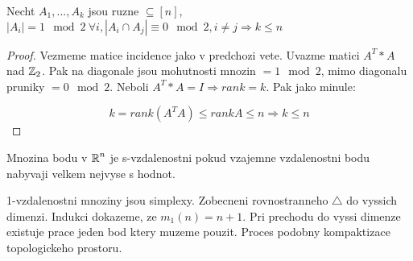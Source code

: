 \begin{theorem}
	Necht $A_1, ... , A_k$ jsou ruzne $ \subseteq [n]$, $ |A_i| = 1 \mod2 \ \forall i, |A_i \cap A_j| \equiv 0 \mod2, i \ne j \Rightarrow k \leq n$
\end{theorem}
\begin{proof}
	Vezmeme matice incidence jako v predchozi vete. Uvazme matici $A^T * A$ nad $\operatorname{\mathbb{Z}}_2$. Pak na diagonale jsou mohutnosti mnozin $ = 1 \mod2$, mimo diagonalu pruniky $= 0 \mod2$. Neboli $A^T * A = I \Rightarrow rank = k$. Pak jako minule:

	\[ k = rank(A^TA) \leq rank A \leq n \Rightarrow k \leq n \]
\end{proof}

\begin{definition}
Mnozina bodu v $\operatorname{\mathbb{R}}^n$ je s-vzdalenostni pokud vzajemne vzdalenostni bodu nabyvaji velkem nejvyse s hodnot.
\end{definition}

\begin{observation}
	1-vzdalenostni mnoziny jsou simplexy. Zobecneni rovnostranneho $\triangle$ do vyssich dimenzi. Indukci dokazeme, ze $m_1(n) = n + 1$. Pri prechodu do vyssi dimenze existuje prace jeden bod ktery muzeme pouzit. Proces podobny kompaktizace topologickeho prostoru.
\end{observation}

